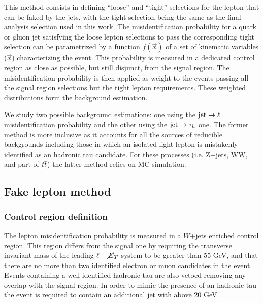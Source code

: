 This method consists in defining ``loose'' and ``tight'' selections for the lepton that can be faked by the jets, with the tight selection being the same as the final analysis selection used in this work.
The misidentification probability for a quark or gluon jet satisfying the loose lepton selections to pass the corresponding tight selection can be parametrized by a function $f(\vec{x})$ of a set of kinematic variables ($\vec{x}$) characterizing the event. This probability is measured in a dedicated control region as close as possible, but still disjunct, from the signal region. The misidentification probability is then applied as weight to the events passing all the signal region selections but the tight lepton requirements. These weighted distributions form the background estimation.

We study two possible background estimations: one using the $\mathrm{jet} \rightarrow \ell$ misidentification probability and the other using the $\mathrm{jet} \rightarrow \tau_h$ one. The former method is more inclusive as it accounts for all the sources of reducible backgrounds including those in which an isolated light lepton is mistakenly identified as an hadronic tau candidate. For these processes (i.e. Z+jets, WW, and part of $t\overline{t}$) the latter method relies on MC simulation. 

\subsection{Fake lepton method}
\label{sec:fakemethod}
\subsubsection{Control region definition}
The lepton misidentification probability is measured in a $W$+jets enriched control region.
This region differs from the signal one by requiring the transverse invariant mass of the leading $\ell-\cancel{E}_T$ system to be greater than 55 GeV,
and that there are no more than two identified electron or muon candidates in the event. Events containing a well identified hadronic tau are also vetoed removing any overlap with the signal region. In order to mimic the presence of an hadronic tau the event is required to contain an additional jet with \pT above $20$ GeV.

